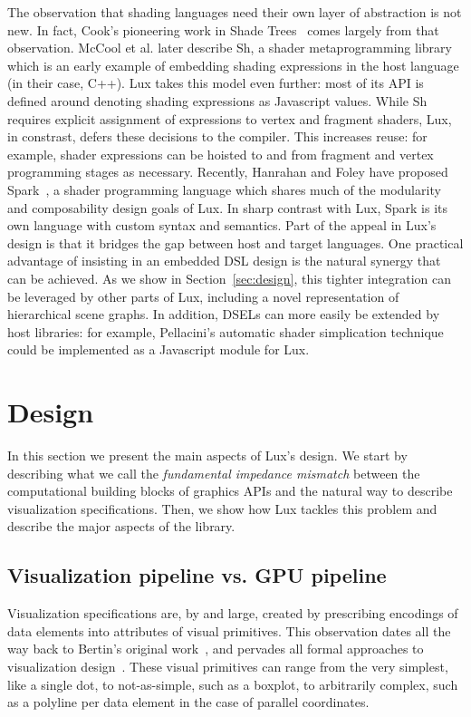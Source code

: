The observation that shading languages need their own layer of abstraction is not new. In fact, Cook's pioneering work in Shade Trees~\cite{Cook:1984:ST} comes largely from that observation.
McCool et al. later describe Sh, a shader metaprogramming library~\cite{McCool:2002:SM, McCool:2004:SA} which is an early example of embedding shading expressions in the host language (in their case, C++). 
%
Lux takes this model even further: most of its API is defined around denoting shading expressions as Javascript values. 
While Sh requires explicit assignment of expressions to vertex and fragment shaders, Lux, in constrast, defers these decisions to the compiler.
This increases reuse: for example, shader expressions can be hoisted to and from fragment and vertex programming stages as necessary.
Recently, Hanrahan and Foley have proposed Spark~\cite{Foley:2011:SMC}, a shader programming language which shares much of the modularity and composability design goals of Lux. 
In sharp contrast with Lux, Spark is its own language with custom syntax and semantics. 
Part of the appeal in Lux's design is that it bridges the gap between host and target languages.
One practical advantage of insisting in an embedded DSL design is the natural synergy that can be achieved. 
As we show in Section~\ref{sec:design}, this tighter integration can be leveraged by other parts of Lux, including a novel representation of hierarchical scene graphs.
In addition, DSELs can more easily be extended by host libraries: for example, Pellacini's automatic shader simplication technique~\cite{Pellacini:2005:UCA} could be implemented as a Javascript module for Lux. 


\section{Design\label{sec:design}}

In this section we present the main aspects of Lux's design.
We start by describing what we call the \emph{fundamental impedance mismatch} between the computational building blocks of graphics APIs and the natural way to describe visualization specifications. 
Then, we show how Lux tackles this problem and describe the major aspects of the library.

\subsection{Visualization pipeline vs. GPU pipeline\label{sec:mismatch}}
Visualization specifications are, by and large, created by prescribing encodings of data elements into attributes of visual primitives. 
This observation dates all the way back to Bertin's original work~\cite{Bertin:1967:SOG}, and pervades all formal approaches to visualization design~\cite{Wickham:2009:GEG,Wilkinson:2005:TGO}.
These visual primitives can range from the very simplest, like a single dot, to not-as-simple, such as a boxplot, to arbitrarily complex, such as a polyline per data element in the case of parallel coordinates. 

